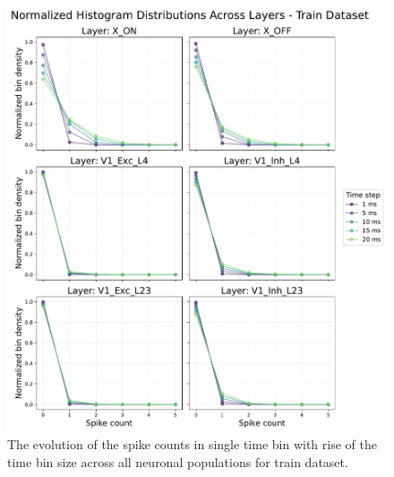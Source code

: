 \begin{figure}
    \centering
    \includegraphics[width=\linewidth]{img/plots/time_step_counts_train.pdf}
    \caption{The evolution of the spike counts in single time bin with rise of the time bin size across all neuronal populations for train dataset.}
    \label{fig:spike_count_distribution_train}
\end{figure}

